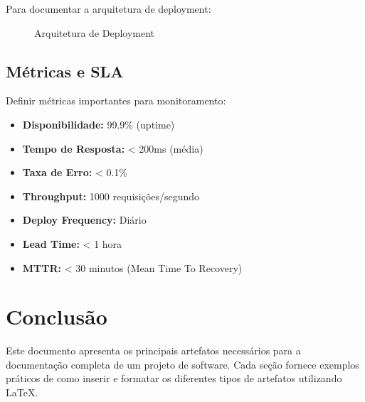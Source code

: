 \documentclass[11pt,a4paper]{article}
\begin{document}
Para documentar a arquitetura de deployment:

\begin{figure}[H]
\centering
{}
\caption{Arquitetura de Deployment}
\label{fig:deployment}
\end{figure}

\subsection{Métricas e SLA}

Definir métricas importantes para monitoramento:

\begin{itemize}
    \item \textbf{Disponibilidade:} 99.9\% (uptime)
    \item \textbf{Tempo de Resposta:} < 200ms (média)
    \item \textbf{Taxa de Erro:} < 0.1\%
    \item \textbf{Throughput:} 1000 requisições/segundo
    \item \textbf{Deploy Frequency:} Diário
    \item \textbf{Lead Time:} < 1 hora
    \item \textbf{MTTR:} < 30 minutos (Mean Time To Recovery)
\end{itemize}

\newpage
\section*{Conclusão}

Este documento apresenta os principais artefatos necessários para a documentação completa de um projeto de software. Cada seção fornece exemplos práticos de como inserir e formatar os diferentes tipos de artefatos utilizando \LaTeX.
\end{document}
